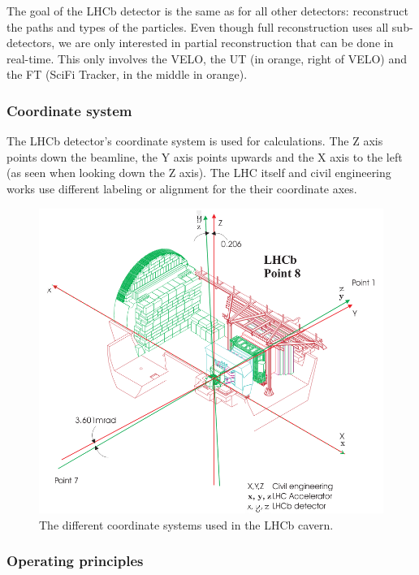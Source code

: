 \documentclass[12pt]{article}
\begin{document}
The goal of the LHCb detector is the same as for all other detectors: reconstruct the paths and types of the particles. Even though full reconstruction uses all sub-detectors, we are only interested in partial reconstruction that can be done in real-time. This only involves the VELO, the UT (in orange, right of VELO) and the FT (SciFi Tracker, in the middle in orange).


\subsubsection{Coordinate system}\label{sec_coordinate_system}

The LHCb detector's coordinate system is used for calculations. The Z axis points down the beamline, the Y axis points upwards and the X axis to the left (as seen when looking down the Z axis). The LHC itself and civil engineering works use different labeling or alignment for the their coordinate axes.

\begin{figure}[H]
	\includegraphics[width=\textwidth]{intro_lhcb_coordinate_systems}
	\caption{The different coordinate systems used in the LHCb cavern.}
	\label{fig_lhcb_coordinate_systems}
\end{figure}


\subsubsection{Operating principles}\label{sec_lhcb_det_theory}
\end{document}
